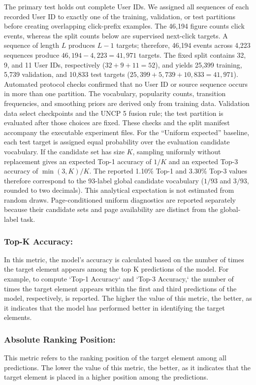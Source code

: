 \documentclass[sn-mathphys-num, Numbered]{sn-jnl}%
\theoremstyle{thmstyleone}%
\theoremstyle{thmstyletwo}%
\theoremstyle{thmstylethree}%
\providecommand{\DIFadd}[1]{{\protect\color{green!40!black}#1}} %
\providecommand{\DIFaddbegin}{} %
\providecommand{\DIFaddend}{} %
\newcommand{\DIFaddincludegraphics}[2][]{{\color{blue}\fbox{\DIFOincludegraphics[#1]{#2}}}} %
\DeclareRobustCommand{\DIFaddbegin}{\DIFOaddbegin \let\includegraphics\DIFaddincludegraphics} %
\DeclareRobustCommand{\DIFaddend}{\DIFOaddend \let\includegraphics\DIFOincludegraphics} %
\begin{document}
\DIFaddbegin \DIFadd{The primary test holds out complete User IDs. We assigned all sequences of each recorded User ID to exactly one of the training, validation, or test partitions before creating overlapping click-prefix examples. The 46,194 figure counts click events, whereas the split counts below are supervised next-click targets. A sequence of length $L$ produces $L-1$ targets; therefore, 46,194 events across 4,223 sequences produce $46{,}194-4{,}223=41{,}971$ targets. The fixed split contains 32, 9, and 11 User IDs, respectively ($32+9+11=52$), and yields 25,399 training, 5,739 validation, and 10,833 test targets ($25{,}399+5{,}739+10{,}833=41{,}971$). Automated protocol checks confirmed that no User ID or source sequence occurs in more than one partition. The vocabulary, popularity counts, transition frequencies, and smoothing priors are derived only from training data. Validation data select checkpoints and the UNCP 5 fusion rule; the test partition is evaluated after those choices are fixed. These checks and the split manifest accompany the executable experiment files.
\DIFadd{For the ``Uniform expected'' baseline, each test target is assigned equal probability over the evaluation candidate vocabulary. If the candidate set has size $K$, sampling uniformly without replacement gives an expected Top-1 accuracy of $1/K$ and an expected Top-3 accuracy of $\min(3,K)/K$. The reported 1.10\% Top-1 and 3.30\% Top-3 values therefore correspond to the 93-label global candidate vocabulary ($1/93$ and $3/93$, rounded to two decimals). This analytical expectation is not estimated from random draws. Page-conditioned uniform diagnostics are reported separately because their candidate sets and page availability are distinct from the global-label task.}
}

\DIFaddend \subsubsection{Top-K Accuracy:}
In this metric, the model's accuracy is calculated based on the number of times the target element appears among the top K predictions of the model. For example, to compute `Top-1 Accuracy` and `Top-3 Accuracy,` the number of times the target element appears within the first and third predictions of the model, respectively, is reported. The higher the value of this metric, the better, as it indicates that the model has performed better in identifying the target elements.

\subsubsection{Absolute Ranking Position:}
This metric refers to the ranking position of the target element among all predictions. The lower the value of this metric, the better, as it indicates that the target element is placed in a higher position among the predictions.
\end{document}
